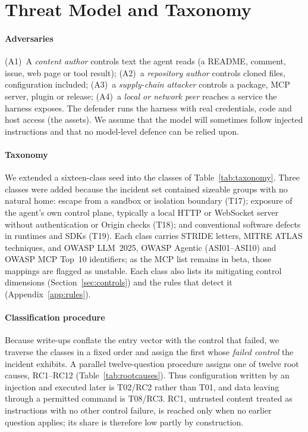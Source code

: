 \section{Threat Model and Taxonomy}\label{sec:threats}

\paragraph*{Adversaries} (A1)~A \emph{content author} controls text the agent reads (a README, comment, issue, web page or tool result); (A2)~a \emph{repository author} controls cloned files, configuration included; (A3)~a \emph{supply-chain attacker} controls a package, MCP server, plugin or release; (A4)~a \emph{local or network peer} reaches a service the harness exposes. The defender runs the harness with real credentials, code and host access (the assets). We assume that the model will sometimes follow injected instructions and that no model-level defence can be relied upon.

\paragraph*{Taxonomy} We extended a sixteen-class seed into the classes of Table~\ref{tab:taxonomy}. Three classes were added because the incident set contained sizeable groups with no natural home: escape from a sandbox or isolation boundary (T17); exposure of the agent's own control plane, typically a local HTTP or WebSocket server without authentication or Origin checks (T18); and conventional software defects in runtimes and SDKs (T19). Each class carries STRIDE letters, MITRE ATLAS techniques, and OWASP LLM~2025, OWASP Agentic (ASI01--ASI10) and OWASP MCP Top~10 identifiers; as the MCP list remains in beta, those mappings are flagged as unstable. Each class also lists its mitigating control dimensions (Section~\ref{sec:controls}) and the \tool{} rules that detect it (Appendix~\ref{app:rules}).

\paragraph*{Classification procedure} Because write-ups conflate the entry vector with the control that failed, we traverse the classes in a fixed order and assign the first whose \emph{failed control} the incident exhibits. A parallel twelve-question procedure assigns one of twelve root causes, RC1--RC12 (Table~\ref{tab:rootcauses}). Thus configuration written by an injection and executed later is T02/RC2 rather than T01, and data leaving through a permitted command is T08/RC3. RC1, untrusted content treated as instructions with no other control failure, is reached only when no earlier question applies; its share is therefore low partly by construction.


